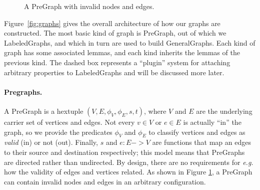 \begin{figure}[t]
\centering
{}
\endpgfgraphicnamed
\vspace{1ex}
\caption{A PreGraph with invalid nodes and edges.}\label{fig:pregraph}
\end{figure}

Figure~\ref{fig:graphs} gives the overall architecture of how our graphs are constructed.
The most basic kind of graph is PreGraph, out of which we LabeledGraphs, and which in turn are used
to build GeneralGraphs.  Each kind of graph has some associated lemmas, and each kind inherits the lemmas of the previous kind.  The dashed box represents a ``plugin'' system for attaching arbitrary properties to LabeledGraphs and will be discussed more later. %

\paragraph{Pregraphs.} A PreGraph is a hextuple $(V, E, \phi_V, \phi_E, s, t)$,
where $V$ and $E$ are the underlying carrier set of vertices and edges.  Not every $v \in V$ or $e \in E$ is actually ``in'' the graph, so we provide the predicates $\phi_V$ and $\phi_E$ to classify vertices and edges as \emph{valid} (in) or not (out).  Finally, $s$ and $e : E -> V$ are functions that map an edges to their source and destination respectively; this model means that PreGraphs are directed rather than undirected.  By design, there are no requirements for \emph{e.g.} how the validity of edges and vertices related.  As shown in Figure \ref{fig:pregraph}, a PreGraph can contain invalid nodes and edges in an arbitrary configuration.

